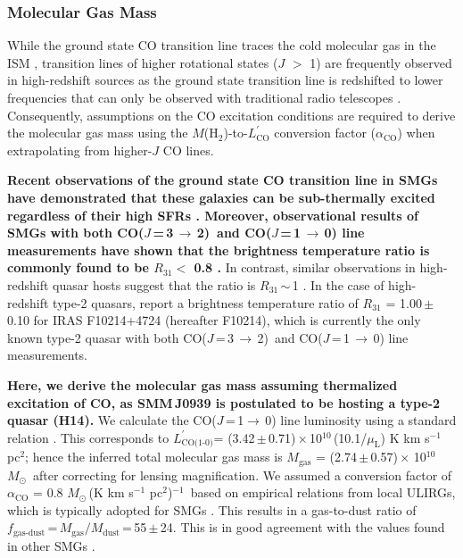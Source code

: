\documentclass[iop]{emulateapj}
\newcommand{\Msun}{\mbox{$M_{\odot}$}}
\newcommand{\rarr}{$\rightarrow$}
\newcommand{\CO}{\mbox{CO($J$\,=\,3\,$\rightarrow$\,2) }}
\newcommand{\Lp}{\mbox{$L^{\prime}_\textrm{CO(1-0)}$}}
\newcommand{\LpU}{\mbox{K\,\,km\,\,s$^{-1}$\,\,pc$^2$}}
\newcommand{\eg}{{\sl e.g.,~}}
\newcommand{\pmOne}{\mbox{$^{-1}$}}
\begin{document}
\subsubsection{Molecular Gas Mass} \label{sec:gas}
While the ground state CO transition line traces the cold molecular gas in the ISM
\citep*[\eg][]{Wilson70a,Downes98a}, transition lines of higher rotational states ($J$ $>$ 1) are frequently observed in high-redshift sources as the
 ground state transition line is redshifted to lower frequencies that can only be observed with traditional radio telescopes
 \citep{Carilli13a}. Consequently, assumptions on the CO excitation conditions are required to derive the molecular gas mass using the $M$(H$_\textrm{2}$)-to-$L^{\prime}_\textrm{CO}$
 conversion factor ($\alpha_\mathrm{CO}$) when extrapolating from higher-$J$ CO lines. \par
{\bf Recent observations of the ground state CO transition line in SMGs have demonstrated that these galaxies can be sub-thermally excited regardless of their high SFRs
   \citep{Harris10a,Riechers11c,Riechers11d,Ivison11a}. 
 Moreover, observational results of SMGs with both \CO and CO($J$\,=\,1\,\rarr\,0) line measurements have shown that the
   brightness temperature ratio is commonly found to be $R_\textrm{31}<$ 0.8 \citep
   {Harris10a,Carilli10a,Swinbank2010a,Ivison10d,Ivison11a,Riechers11d}.} In contrast, similar observations in high-redshift quasar hosts suggest that the ratio
   is $R_\textrm{31}$\,$\sim$\,1 \citep{Riechers06a, Riechers11a}. In the case of high-redshift type-2 quasars, \citet{Riechers11a} report a brightness temperature ratio of $R_\textrm{31}$ = 1.00\,$\pm$\,0.10 for IRAS F10214+4724 (hereafter F10214), which is currently the only known type-2 quasar with both \CO and CO($J$\,=\,1\,\rarr\,0) line measurements. \par
{\bf Here, we derive the molecular gas mass
assuming thermalized excitation of CO, as SMM\,J0939 is
postulated to be hosting a type-2 quasar (H14).}
We calculate the CO($J$\,=\,1\rarr\,0) line luminosity using a standard relation
\citep[\eg][]{Solomon05a}. This corresponds to \Lp = (3.42\,$\pm$\,0.71)\,$\times$\,10$^{10}$\,(10.1/$\mu_\textrm{L}$) \LpU; hence the inferred total molecular gas mass is $M_\textrm{gas}$ = (2.74\,$\pm$\,0.57)\,$\times$\,\,10$^{10}$\,\Msun\, after correcting for lensing magnification. We assumed a conversion factor of $\alpha_\textrm{CO}$ = 0.8\,\,\Msun\,(\LpU)\pmOne\ based on empirical relations from local ULIRGs, which is typically
adopted for SMGs \citep[\eg][]{Tacconi06a,Tacconi08a,Bothwell13a}.
This results in a gas-to-dust
ratio of $f_\textrm{gas-dust}$\,=\,$M_\textrm{gas}/M_\textrm{dust}$\,=\,55\,$\pm$\,24. 
This is in good agreement  with the
values found in other SMGs \citep{Coppin08a,Micha10a,Riechers11c}.
\end{document}
